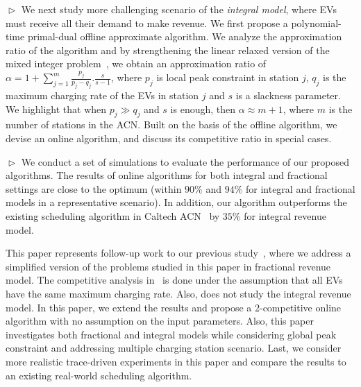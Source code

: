 $\vartriangleright$ We next study  more challenging scenario of the \textit{integral model}, where EVs must receive all their demand to make revenue. We first propose a polynomial-time primal-dual offline approximate algorithm. We analyze the approximation ratio of the algorithm and by strengthening the linear relaxed version of the mixed integer problem~\cite{Carr}, we obtain an approximation ratio of $\alpha =1+\sum_{j=1}^m {\frac{p_j}{p_j-q_j}}.\frac{s}{s-1}$, where $p_j$ is local peak constraint in station $j$, $q_j$ is the maximum charging rate of the EVs in station $j$ and $s$ is a slackness parameter. We highlight that when $p_j \gg q_j$ and $s$ is  enough, then $\alpha \approx m+1$, where $m$ is the number of stations in the ACN. Built on the basis of the offline algorithm, we devise an online algorithm, and discuss its competitive ratio in special cases. 

$\vartriangleright$ We conduct a set of  simulations to evaluate the performance of our proposed algorithms. 
The results of online algorithms for both integral and fractional settings are close to the optimum (within $90\%$ and $94\%$ for integral and fractional models in a representative scenario). In addition, our algorithm outperforms the existing scheduling algorithm in Caltech ACN~\cite{lee2018adaptive} by $35\%$ for integral revenue model.

This paper represents follow-up work to our previous study~\cite{alinia2018competitive}, where we address a simplified version of the problems studied in this paper in fractional revenue model. The competitive analysis in~\cite{alinia2018competitive} is done under the assumption that all EVs have the same maximum charging rate. Also, \cite{alinia2018competitive} does not study the integral revenue model. In this paper, we extend the results and propose a 2-competitive online algorithm with no assumption on the input parameters. Also, this paper investigates both fractional and integral models while considering global peak constraint and addressing multiple charging station scenario. Last, we consider more realistic trace-driven experiments in this paper and compare the results to an existing real-world scheduling algorithm.

